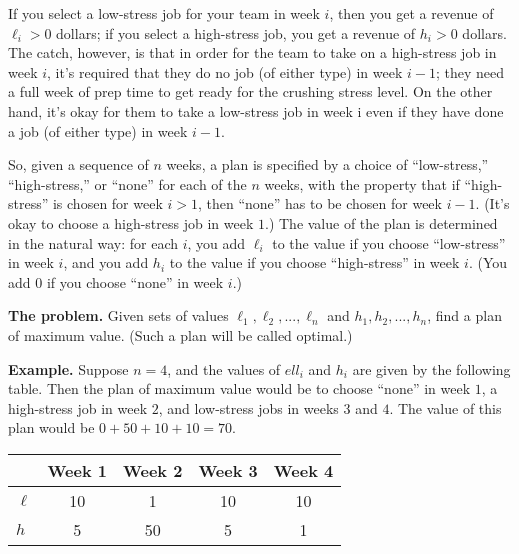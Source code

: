 \documentclass[12pt, letterpaper]{article}
\newcommand{\grayrow}{\rowcolor[gray]{.8}}
\begin{document}
If you select a low-stress job for your team in week $i$, then you get a revenue of $\ell_i > 0$ dollars; 
if you select a high-stress job, you get a revenue of $h_i > 0$ dollars. 
The catch, however, is that in order for the team to take on a high-stress job in week $i$, it's required that they do no job (of either type) in week $i - 1$; 
they need a full week of prep time to get ready for the crushing stress level. On the other hand, it's okay for them to take a low-stress job in week i even if they have done a job (of either type) in week $i - 1$.

So, given a sequence of $n$ weeks, a plan is specified by a choice of ``low-stress,'' ``high-stress,'' or ``none'' for each of the $n$ weeks, 
with the property that if ``high-stress'' is chosen for week $i > 1$, then ``none'' has to be chosen for week $i - 1$. 
(It's okay to choose a high-stress job in week $1$.) 
The value of the plan is determined in the natural way: for each $i$, you add $\ell_i$ to the value if you choose ``low-stress'' in week $i$, 
and you add $h_i$ to the value if you choose ``high-stress'' in week $i$. (You add $0$ if you choose ``none'' in week $i$.)


\vspace{3mm}
\noindent\textbf{The problem.} Given sets of values $\ell_1, \ell_2, ..., \ell_n$ and $h_1, h_2, ..., h_n$, find a plan of maximum value. (Such a plan will be called optimal.)

\vspace{3mm}
\noindent\textbf{Example.} Suppose $n = 4$, and the values of $ell_i$ and $h_i$ are given by the following table. 
Then the plan of maximum value would be to choose ``none'' in week $1$, a high-stress job in week $2$, and low-stress jobs in weeks $3$ and $4$. The value of this plan would be $0 + 50 + 10 + 10 = 70$.

\vspace{5mm}
\begin{table}[h!]
    \centering
    \begin{tabular}{lcccc}
        \hline
        \grayrow        & \textbf{Week 1} & \textbf{Week 2} & \textbf{Week 3} & \textbf{Week 4} \\
        \hline
        $\ell$      & 10 &  1 & 10 & 10 \\
        $h$         &  5 & 50 &  5 &  1 \\
        \hline
    \end{tabular}
\end{table}
\end{document}
